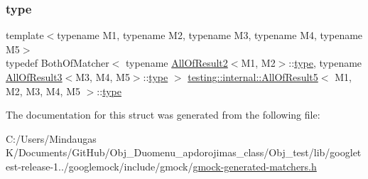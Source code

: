 \subsubsection{\texorpdfstring{type}{type}}
{\footnotesize\ttfamily template$<$typename M1, typename M2, typename M3, typename M4, typename M5$>$ \\
typedef Both\+Of\+Matcher$<$ typename \mbox{\hyperlink{structtesting_1_1internal_1_1_all_of_result2}{All\+Of\+Result2}}$<$M1, M2$>$\+::\mbox{\hyperlink{structtesting_1_1internal_1_1_all_of_result5_aee2e1fb803f428741d147347b692d108}{type}}, typename \mbox{\hyperlink{structtesting_1_1internal_1_1_all_of_result3}{All\+Of\+Result3}}$<$M3, M4, M5$>$\+::\mbox{\hyperlink{structtesting_1_1internal_1_1_all_of_result5_aee2e1fb803f428741d147347b692d108}{type}} $>$ \mbox{\hyperlink{structtesting_1_1internal_1_1_all_of_result5}{testing\+::internal\+::\+All\+Of\+Result5}}$<$ M1, M2, M3, M4, M5 $>$\+::\mbox{\hyperlink{structtesting_1_1internal_1_1_all_of_result5_aee2e1fb803f428741d147347b692d108}{type}}}



The documentation for this struct was generated from the following file\+:\begin{DoxyCompactItemize}
\item 
C\+:/\+Users/\+Mindaugas K/\+Documents/\+Git\+Hub/\+Obj\+\_\+\+Duomenu\+\_\+apdorojimas\+\_\+class/\+Obj\+\_\+test/lib/googletest-\/release-\/1../googlemock/include/gmock/\mbox{\hyperlink{_obj__test_2lib_2googletest-release-1_88_81_2googlemock_2include_2gmock_2gmock-generated-matchers_8h}{gmock-\/generated-\/matchers.\+h}}\end{DoxyCompactItemize}
